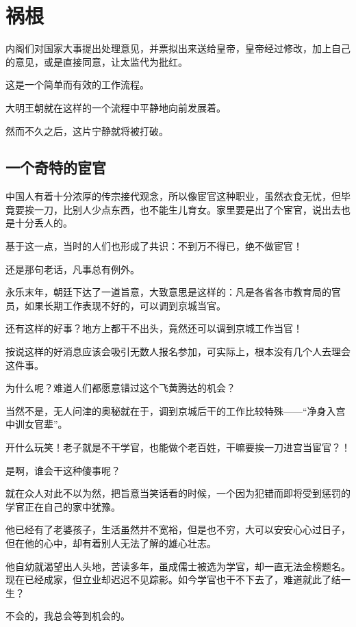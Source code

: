 \section{祸根}
\ifnum{}
	\begin{multicols}{\theparacolNo}
\fi
内阁们对国家大事提出处理意见，并票拟出来送给皇帝，皇帝经过修改，加上自己的意见，或是直接同意，让太监代为批红。

这是一个简单而有效的工作流程。

大明王朝就在这样的一个流程中平静地向前发展着。

然而不久之后，这片宁静就将被打破。

\subsection{一个奇特的宦官}
中国人有着十分浓厚的传宗接代观念，所以像宦官这种职业，虽然衣食无忧，但毕竟要挨一刀，比别人少点东西，也不能生儿育女。家里要是出了个宦官，说出去也是十分丢人的。

基于这一点，当时的人们也形成了共识：不到万不得已，绝不做宦官！

还是那句老话，凡事总有例外。

永乐末年，朝廷下达了一道旨意，大致意思是这样的：凡是各省各市教育局的官员，如果长期工作表现不好的，可以调到京城当官。

还有这样的好事？地方上都干不出头，竟然还可以调到京城工作当官！

按说这样的好消息应该会吸引无数人报名参加，可实际上，根本没有几个人去理会这件事。

为什么呢？难道人们都愿意错过这个飞黄腾达的机会？

当然不是，无人问津的奥秘就在于，调到京城后干的工作比较特殊——“净身入宫中训女官辈”。

开什么玩笑！老子就是不干学官，也能做个老百姓，干嘛要挨一刀进宫当宦官？！

是啊，谁会干这种傻事呢？

就在众人对此不以为然，把旨意当笑话看的时候，一个因为犯错而即将受到惩罚的学官正在自己的家中犹豫。

他已经有了老婆孩子，生活虽然并不宽裕，但是也不穷，大可以安安心心过日子，但在他的心中，却有着别人无法了解的雄心壮志。

他自幼就渴望出人头地，苦读多年，虽成儒士被选为学官，却一直无法金榜题名。现在已经成家，但立业却迟迟不见踪影。如今学官也干不下去了，难道就此了结一生？

不会的，我总会等到机会的。


\end{multicols}
